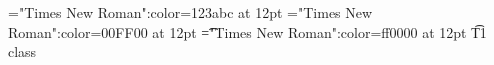 \font\wzt="Times New Roman":color=123abc at 12pt
\font\zt="Times New Roman":color=00FF00 at 12pt
\font\t="Times New Roman":color=ff0000 at 12pt
\t{T1 class }




\bye
